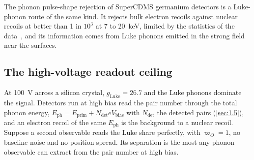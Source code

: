 The phonon pulse-shape rejection of SuperCDMS germanium detectors is a Luke-phonon route of the same kind. It rejects bulk electron recoils against nuclear recoils at better than 1 in $10^3$ at 7 to \SI{20}{keV}, limited by the statistics of the data~\cite[Sect.~3]{hertel2012phonon}, and its information comes from Luke phonons emitted in the strong field near the surfaces.

\subsection{The high-voltage readout ceiling}\label{sec:20.5-hv}

At \SI{100}{V} across a silicon crystal, $g_{\mathrm{Luke}} = 26.7$ and the Luke phonons dominate the signal. Detectors run at high bias read the pair number through the total phonon energy, $E_{\mathrm{ph}} = E_{\mathrm{prim}} + N_{\mathrm{det}}eV_{\mathrm{bias}}$ with $N_{\mathrm{det}}$ the detected pairs (\cref{sec:1.5}), and an electron recoil of the same $E_{\mathrm{ph}}$ is the background to a nuclear recoil. Suppose a second observable reads the Luke share perfectly, with $\varpi_O = 1$, no baseline noise and no position spread. Its separation is the most any phonon observable can extract from the pair number at high bias.

